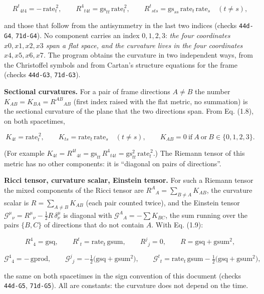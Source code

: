 \documentclass[
  10pt,
]{article}
\begin{document}
\[R^t{}_{4t4}=-\,\mathrm{rate}_t^{\,2},\qquad R^4{}_{t4t}=\mathrm{gs}_{tt}\,\mathrm{rate}_t^{\,2},\qquad
R^t{}_{sts}=\mathrm{gs}_{ss}\,\mathrm{rate}_t\,\mathrm{rate}_s\quad(t\neq s),\tag{1.8}\]

and those that follow from the antisymmetry in the last two indices
(checks \texttt{44d-G4}, \texttt{71d-G4}). No component carries an index
\(0,1,2,3\): \emph{the four coordinates \(x0,x1,x2,x3\) span a flat
space, and the curvature lives in the four coordinates \(x4,x5,x6,x7\).}
The program obtains the curvature in two independent ways, from the
Christoffel symbols and from Cartan's structure equations for the frame
(checks \texttt{44d-G3}, \texttt{71d-G3}).

\textbf{Sectional curvatures.} For a pair of frame directions
\(A\neq B\) the number \(K_{AB}=K_{BA}=R^{AB}{}_{AB}\) (first index
raised with the flat metric, no summation) is the sectional curvature of
the plane that the two directions span. From Eq. (1.8), on both
spacetimes,

\[K_{4t}=\mathrm{rate}_t^{\,2},\qquad K_{ts}=\mathrm{rate}_t\,\mathrm{rate}_s\quad(t\neq s),\qquad
K_{AB}=0\ \text{if}\ A\ \text{or}\ B\in\{0,1,2,3\}.\tag{1.9}\]

(For example
\(K_{4t}=R^{4t}{}_{4t}=\mathrm{gs}_{tt}\,R^4{}_{t4t}=\mathrm{gs}_{tt}^2\,\mathrm{rate}_t^{\,2}\).)
The Riemann tensor of this metric has no other components: it is
``diagonal on pairs of directions''.

\textbf{Ricci tensor, curvature scalar, Einstein tensor.} For such a
Riemann tensor the mixed components of the Ricci tensor are
\(R^A{}_A=\sum_{B\neq A}K_{AB}\), the curvature scalar is
\(R=\sum_{A\neq B}K_{AB}\) (each pair counted twice), and the Einstein
tensor \(\mathcal G^\mu{}_\nu=R^\mu{}_\nu-\tfrac12R\,\delta^\mu_\nu\) is
diagonal with \(\mathcal G^A{}_A=-\sum K_{BC}\), the sum running over
the pairs \(\{B,C\}\) of directions that do not contain \(A\). With Eq.
(1.9):

\[R^4{}_4=\mathrm{gsq},\qquad R^t{}_t=\mathrm{rate}_t\,\mathrm{gsum},\qquad R^j{}_j=0,\qquad
R=\mathrm{gsq}+\mathrm{gsum}^2,\tag{1.10}\]

\[\mathcal G^4{}_4=-\,\mathrm{gprod},\qquad
\mathcal G^j{}_j=-\tfrac12\big(\mathrm{gsq}+\mathrm{gsum}^2\big),\qquad
\mathcal G^t{}_t=\mathrm{rate}_t\,\mathrm{gsum}-\tfrac12\big(\mathrm{gsq}+\mathrm{gsum}^2\big),\tag{1.11}\]

the same on both spacetimes in the sign convention of this document
(checks \texttt{44d-G5}, \texttt{71d-G5}). All are constants: the
curvature does not depend on the time.
\end{document}
